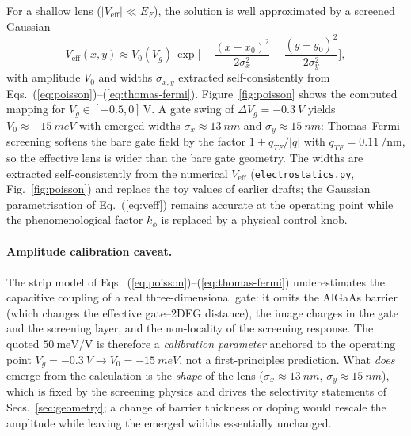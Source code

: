 \documentclass[11pt,a4paper]{article}
\begin{document}
For a shallow lens ($|V_{\text{eff}}|\ll E_F$), the solution is well 
approximated by a screened Gaussian
\begin{equation}
V_{\text{eff}}(x,y) \approx V_0(V_g)\,
\exp\!\Big[-\frac{(x-x_0)^2}{2\sigma_x^2}-\frac{(y-y_0)^2}{2\sigma_y^2}\Big],
\label{eq:veff}
\end{equation}
with amplitude $V_0$ and widths $\sigma_{x,y}$ extracted self-consistently 
from Eqs.~(\ref{eq:poisson})--(\ref{eq:thomas-fermi}). Figure~\ref{fig:poisson} 
shows the computed mapping for $V_g\in[-0.5,0]\,$V. A gate swing of 
$\Delta V_g=\SI{-0.3}{V}$ yields $V_0\approx\SI{-15}{meV}$ with emerged 
widths $\sigma_x\approx\SI{13}{nm}$ and $\sigma_y\approx\SI{15}{nm}$: 
Thomas--Fermi screening softens the bare gate field by the factor 
$1+q_{TF}/|q|$ with $q_{TF}=\SI{0.11}{\per\nano\meter}$, so the effective 
lens is wider than the bare gate geometry. The widths are extracted 
self-consistently from the numerical $V_{\text{eff}}$ 
(\texttt{electrostatics.py}, Fig.~\ref{fig:poisson}) and replace the toy 
values of earlier drafts; the Gaussian parametrisation of Eq.~(\ref{eq:veff}) 
remains accurate at the operating point while the phenomenological factor
$k_\phi$ is replaced by a physical control knob.

\paragraph{Amplitude calibration caveat.} The strip model of
Eqs.~(\ref{eq:poisson})--(\ref{eq:thomas-fermi}) underestimates the
capacitive coupling of a real three-dimensional gate: it omits the AlGaAs
barrier (which changes the effective gate--2DEG distance), the image
charges in the gate and the screening layer, and the non-locality of the
screening response. The quoted $50~\mathrm{meV/V}$ is therefore a
\emph{calibration parameter} anchored to the operating point
$V_g=\SI{-0.3}{V}\to V_0=\SI{-15}{meV}$, not a first-principles prediction.
What \emph{does} emerge from the calculation is the \emph{shape} of the
lens ($\sigma_x\approx\SI{13}{nm}$, $\sigma_y\approx\SI{15}{nm}$), which
is fixed by the screening physics and drives the selectivity statements of
Secs.~\ref{sec:geometry}; a change of barrier thickness or doping would
rescale the amplitude while leaving the emerged widths essentially
unchanged.
\end{document}
